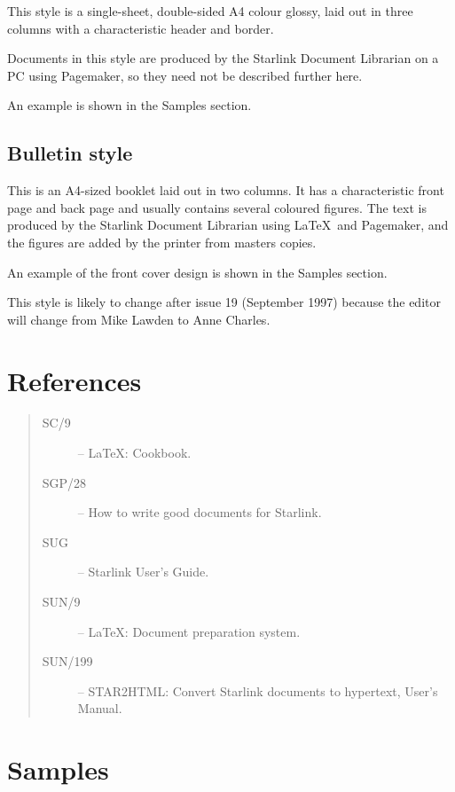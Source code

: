 \documentclass[twoside,11pt]{article}
\newcommand{\xref}[3]{#1}
\newcommand{\xlabel}[1]{}
\begin{document}
This style is a single-sheet, double-sided A4 colour glossy, laid out in three
columns with a characteristic header and border.

Documents in this style are produced by the Starlink Document Librarian on a
PC using Pagemaker, so they need not be described further here.

An example is shown in the Samples section.

\subsection{\label{bulletin_style}\xlabel{bulletin_style}Bulletin style}

This is an A4-sized booklet laid out in two columns.
It has a characteristic front page and back page and usually contains several
coloured figures.
The text is produced by the Starlink Document Librarian using \LaTeX\ and
Pagemaker, and the figures are added by the printer from masters copies.

An example of the front cover design is shown in the Samples section.

This style is likely to change after issue 19 (September 1997) because the
editor will change from Mike Lawden to Anne Charles.

\section{\label{references}\xlabel{references}References}

\begin{quote}
\begin{description}
\item [\xref{SC/9}{sc9}{}] -- \LaTeX: Cookbook.
\item [\xref{SGP/28}{sgp28}{}] -- How to write good documents for Starlink.
\item [\xref{SUG}{sug}{}] -- Starlink User's Guide.
\item [\xref{SUN/9}{sun9}{}] -- \LaTeX: Document preparation system.
\item [\xref{SUN/199}{sun199}{}] -- 
 STAR2HTML: Convert Starlink documents to hypertext,
User's Manual.
\end{description}
\end{quote}


\appendix

\section{\label{samples}\xlabel{samples}Samples}
\end{document}
